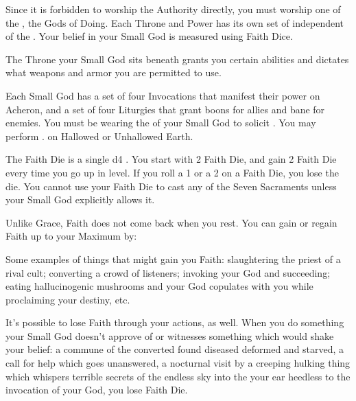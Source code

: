 {

Since it is forbidden to worship the Authority directly, you must worship one of the , the Gods of Doing. Each Throne and Power has its own set of  independent of the .  Your belief in your Small God is measured using Faith Dice. 

The Throne your Small God sits beneath grants you certain abilities and dictates what weapons and armor you are permitted to use. 

Each Small God has a set of four Invocations that manifest their power on Acheron, and a set of four Liturgies that grant boons for allies and bane for enemies.  You must be wearing the  of your Small God to solicit .  You may perform . on Hallowed or Unhallowed Earth.

The Faith Die is a single d4 \POOL.  You start with 2 Faith Die, and gain 2 Faith Die every time you go up in level.  If you roll a 1 or a 2 on a Faith Die, you lose the die.  You cannot use your Faith Die to cast any of the Seven Sacraments unless your Small God explicitly allows it.

Unlike Grace, Faith does not come back when you rest.  You can gain or regain Faith up to your Maximum by:

Some examples of things that might gain you Faith: slaughtering the priest of a rival cult; converting a crowd of listeners; invoking your God and succeeding; eating hallucinogenic mushrooms and your God copulates with you while proclaiming your destiny, etc.

It's possible to lose Faith through your actions, as well.  When you do something your Small God doesn't approve of or witnesses something which would shake your belief: a commune of the converted found diseased deformed and starved, a call for help which goes unanswered, a nocturnal visit by a creeping hulking thing which whispers terrible secrets of the endless sky into the your ear heedless to the invocation of your God, you lose Faith Die.

}
